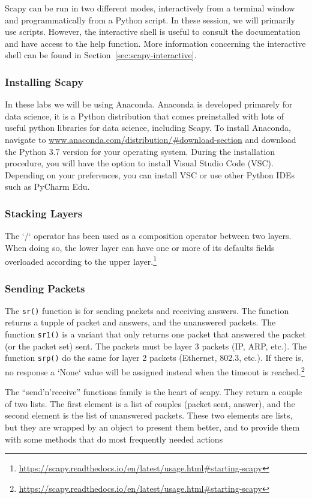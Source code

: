 \documentclass[11pt,a4paper]{article}
\begin{document}
Scapy can be run in two different modes, interactively from a terminal window and programmatically from a Python script. 
In these session, we will primarily use scripts. However, the interactive shell is useful to consult the documentation and have access to the help function. More information concerning the interactive shell can be found in Section~\ref{sec:scapy-interactive}.


\subsubsection{Installing Scapy}
In these labs we will be using Anaconda. Anaconda is developed primarely for data science, it is a Python distribution that comes preinstalled with lots of useful python libraries for data science, including Scapy. To install Anaconda, navigate to \url{www.anaconda.com/distribution/#download-section} and download the Python 3.7 version for your operating system. During the installation procedure, you will have the option to install Visual Studio Code (VSC). Depending on your preferences, you can install VSC or use other Python IDEs such as PyCharm Edu.


\subsubsection{Stacking Layers}
The `/` operator has been used as a composition operator between two layers. When doing so, the lower layer can have one or more of its defaults fields overloaded according to the upper layer.\footnote{\url{https://scapy.readthedocs.io/en/latest/usage.html\#starting-scapy}}

 \subsubsection{Sending Packets}
 The \texttt{sr()} function is for sending packets and receiving answers. The function returns a tupple of packet and answers, and the unanswered packets. The function \texttt{sr1()} is a variant that only returns one packet that answered the packet (or the packet set) sent. The packets must be layer 3 packets (IP, ARP, etc.). The function \texttt{srp()} do the same for layer 2 packets (Ethernet, 802.3, etc.). If there is, no response a `None` value will be assigned instead when the timeout is reached.\footnote{\url{https://scapy.readthedocs.io/en/latest/usage.html\#starting-scapy}}

 The ``send'n'receive'' functions family is the heart of scapy. They return a couple of two lists. The first element is a list of couples (packet sent, answer), and the second element is the list of unanswered packets. These two elements are lists, but they are wrapped by an object to present them better, and to provide them with some methods that do most frequently needed actions
\end{document}
